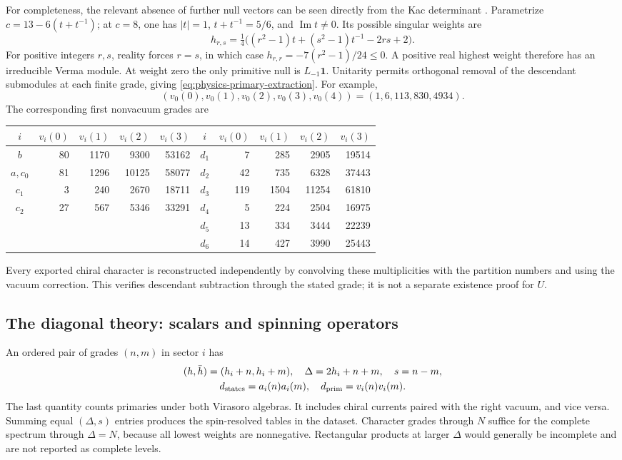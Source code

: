 \documentclass[11pt,a4paper]{article}
\theoremstyle{definition}
\begin{document}
For completeness, the relevant absence of further null vectors can
be seen directly from the Kac determinant
\cite[Lemmas~2--3]{LanglandsVir}.  Parametrize
$c=13-6(t+t^{-1})$; at $c=8$, one has $|t|=1$,
$t+t^{-1}=5/6$, and $\operatorname{Im}t\ne0$.  Its possible singular
weights are
\[
 h_{r,s}=\tfrac14\bigl((r^2-1)t+(s^2-1)t^{-1}-2rs+2\bigr).
\]
For positive integers $r,s$, reality forces $r=s$, in which case
$h_{r,r}=-7(r^2-1)/24\leq0$.  A positive real highest weight therefore
has an irreducible Verma module.  At weight zero the only primitive
null is $L_{-1}\mathbf1$.  Unitarity permits orthogonal removal of
the descendant submodules at each finite grade, giving
\eqref{eq:physics-primary-extraction}.  For example,
\[
 (v_0(0),v_0(1),v_0(2),v_0(3),v_0(4))
 =(1,6,113,830,4934).
\]
The corresponding first nonvacuum grades are
\begin{center}
\begin{tabular}{c|rrrr@{\qquad}c|rrrr}
 $i$&$v_i(0)$&$v_i(1)$&$v_i(2)$&$v_i(3)$&
 $i$&$v_i(0)$&$v_i(1)$&$v_i(2)$&$v_i(3)$\\\hline
 $b$&80&1170&9300&53162&$d_1$&7&285&2905&19514\\
 $a,c_0$&81&1296&10125&58077&$d_2$&42&735&6328&37443\\
 $c_1$&3&240&2670&18711&$d_3$&119&1504&11254&61810\\
 $c_2$&27&567&5346&33291&$d_4$&5&224&2504&16975\\
 &&&&&$d_5$&13&334&3444&22239\\
 &&&&&$d_6$&14&427&3990&25443
\end{tabular}
\end{center}
Every exported chiral character is reconstructed independently by
convolving these multiplicities with the partition numbers and using
the vacuum correction.  This verifies descendant subtraction through
the stated grade; it is not a separate existence proof for $U$.

\subsection{The diagonal theory: scalars and spinning operators}

An ordered pair of grades $(n,m)$ in sector $i$ has
\begin{equation}\label{eq:physics-spectrum-formula}
\begin{gathered}
 (h,\bar h)=(h_i+n,h_i+m),\quad
 \Delta=2h_i+n+m,\quad s=n-m,\\
 d_{\rm states}=a_i(n)a_i(m),\quad
 d_{\rm prim}=v_i(n)v_i(m).
\end{gathered}
\end{equation}
The last quantity counts primaries under both Virasoro algebras.
It includes chiral currents paired with the right vacuum, and vice
versa.  Summing equal $(\Delta,s)$ entries produces the spin-resolved
tables in the dataset.  Character grades through $N$ suffice for the
complete spectrum through $\Delta=N$, because all lowest weights
are nonnegative.  Rectangular products at larger $\Delta$ would
generally be incomplete and are not reported as complete levels.
\end{document}
